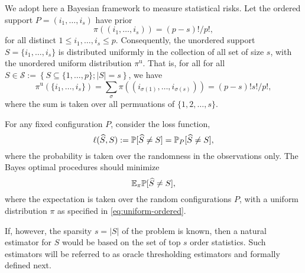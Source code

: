 We adopt here a Bayesian framework to measure statistical risks. 
Let the ordered support $P=(i_1,\ldots,i_s)$ have prior
\begin{equation} \label{eq:uniform-ordered}
\pi((i_1,\ldots, i_s)) = {(p-s)!}/{p!},
\end{equation}
for all distinct $1\le i_1, \ldots, i_s\le p$.
Consequently, the unordered support $S=\{i_1,\ldots,i_s\}$ is distributed uniformly in the collection of all set of size $s$, with the unordered uniform distribution $\pi^{\text{u}}$. That is, for all for all $S\in\mathcal{S}:=\left\{S\subseteq\{1,\ldots,p\};|S|=s\right\}$, we have 
\begin{equation} \label{eq:uniform}
\pi^{\text{u}}
(\{i_1,\ldots, i_s\}) = \sum_{\sigma}\pi((i_{\sigma(1)},\ldots, i_{\sigma(s)})) = {(p-s)!s!}/{p!},
\end{equation}
where the sum is taken over all permuations of $\{1,2,\ldots,s\}$.

For any fixed configuration $P$, consider the loss function,
$$
\ell(\widehat{S},S) := \P[\widehat{S} \neq S] = \P_{P}[\widehat{S} \neq S],
$$
where the probability is taken over the randomness in the observations only.
The Bayes optimal procedures should minimize 
\begin{equation} \label{eq:Bayes-risk}
    \E_\pi \P[\widehat{S} \neq S],
\end{equation}
where the expectation is taken over the random configurations $P$, with a uniform distribution $\pi$ as specified in \eqref{eq:uniform-ordered}.


If, however, the sparsity $s = |S|$ of the problem is known, then a natural estimator for $S$ would be based on the set of top $s$ order statistics. Such estimators will be referred to as oracle thresholding estimators and formally defined next. 

